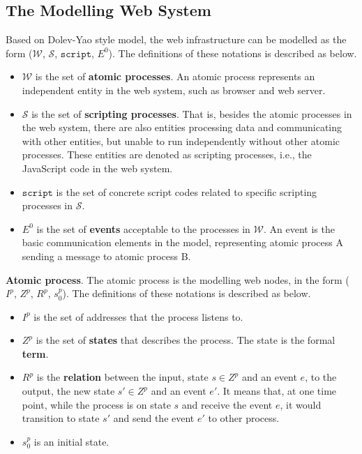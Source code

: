 \subsection{The Modelling Web System}
\label{subsec:webmodel}
Based on Dolev-Yao style model, the web  infrastructure can be modelled as the form ($\mathcal{W}$, $\mathcal{S}$, $\mathtt{script}$, $E^0$). The definitions of these notations is described as below.
\begin{itemize}
\item $\mathcal{W}$ is the set of \textbf{atomic processes}. An atomic process represents an independent entity in the web system, such as browser and web server. 
\item $\mathcal{S}$ is the set of \textbf{scripting processes}. That is, besides the atomic processes in the web system, there are also entities processing data and communicating with other entities, but unable to run independently without other atomic processes. These entities are denoted as scripting processes, i.e., the JavaScript code in the web system.
\item $\mathtt{script}$ is the set of concrete script codes related to specific scripting processes in $\mathcal{S}$.
\item $E^0$ is the set of \textbf{events} acceptable to the processes in $\mathcal{W}$. An event is the basic communication elements in the model, representing atomic process A sending a message to atomic process B. 
\end{itemize}



\vspace{1mm}
\noindent\textbf{Atomic process}. The atomic process is the modelling web nodes, in the form ($I^p$, $Z^p$, $R^p$, $s_0^p$). The definitions of these notations is described as below.
\begin{itemize}
\item $I^p$ is the set of addresses that the process listens to.
\item  $Z^p$ is the set of \textbf{states} that describes the process. The state is the formal \textbf{term}.
\item $R^p$ is the \textbf{relation} between the input, state $s \in Z^p$ and an event $e$, to the output, the new state $s' \in Z^p$ and an event $e'$. It means that, at one time point, while the process is on state $s$ and receive the event $e$, it would transition to state $s'$ and send the event $e'$ to other process.
\item $s_0^p$ is an initial state.
\end{itemize}

